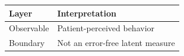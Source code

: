 \begin{tabular}{ll}
\hline
Layer & Interpretation \\
\hline
Observable & Patient-perceived behavior \\
Boundary & Not an error-free latent measure \\
\hline
\end{tabular}
